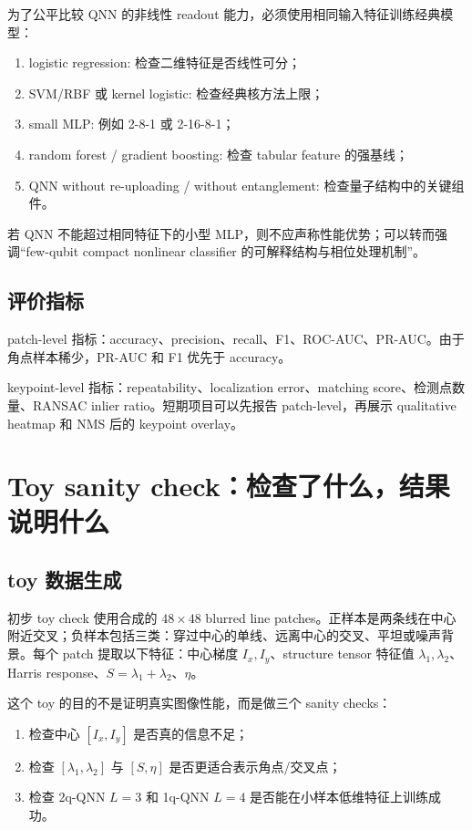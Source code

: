 \documentclass[UTF8,zihao=-4]{ctexart}
\begin{document}
为了公平比较 QNN 的非线性 readout 能力，必须使用相同输入特征训练经典模型：
\begin{enumerate}[leftmargin=2.0em]
    \item logistic regression: 检查二维特征是否线性可分；
    \item SVM/RBF 或 kernel logistic: 检查经典核方法上限；
    \item small MLP: 例如 2-8-1 或 2-16-8-1；
    \item random forest / gradient boosting: 检查 tabular feature 的强基线；
    \item QNN without re-uploading / without entanglement: 检查量子结构中的关键组件。
\end{enumerate}

若 QNN 不能超过相同特征下的小型 MLP，则不应声称性能优势；可以转而强调“few-qubit compact nonlinear classifier 的可解释结构与相位处理机制”。

\subsection{评价指标}

patch-level 指标：accuracy、precision、recall、F1、ROC-AUC、PR-AUC。由于角点样本稀少，PR-AUC 和 F1 优先于 accuracy。

keypoint-level 指标：repeatability、localization error、matching score、检测点数量、RANSAC inlier ratio。短期项目可以先报告 patch-level，再展示 qualitative heatmap 和 NMS 后的 keypoint overlay。

\section{Toy sanity check：检查了什么，结果说明什么}

\subsection{toy 数据生成}

初步 toy check 使用合成的 $48\times48$ blurred line patches。正样本是两条线在中心附近交叉；负样本包括三类：穿过中心的单线、远离中心的交叉、平坦或噪声背景。每个 patch 提取以下特征：中心梯度 $I_x,I_y$、structure tensor 特征值 $\lambda_1,\lambda_2$、Harris response、$S=\lambda_1+\lambda_2$、$\eta$。

这个 toy 的目的不是证明真实图像性能，而是做三个 sanity checks：
\begin{enumerate}[leftmargin=2.0em]
    \item 检查中心 $[I_x,I_y]$ 是否真的信息不足；
    \item 检查 $[\lambda_1,\lambda_2]$ 与 $[S,\eta]$ 是否更适合表示角点/交叉点；
    \item 检查 2q-QNN $L=3$ 和 1q-QNN $L=4$ 是否能在小样本低维特征上训练成功。
\end{enumerate}
\end{document}
